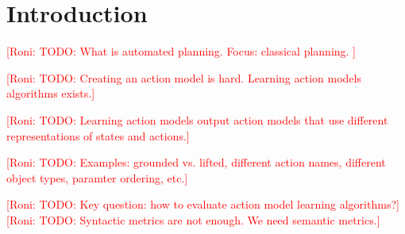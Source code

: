 \documentclass{article}
\theoremstyle{definition}
\theoremstyle{remark}
\newcommand{\roni}[1]{{\textcolor{red}{[Roni: #1]}}}
\begin{document}
\begin{abstract}
\end{abstract}

\section{Introduction}

\roni{TODO: What is automated planning. Focus: classical planning. }


\roni{TODO: Creating an action model is hard. Learning action models algorithms exists.}

\roni{TODO: Learning action models output action models that use different representations of states and actions.}


\roni{TODO: Examples: grounded vs. lifted, different action names, different object types, paramter ordering, etc.}

\roni{TODO: Key question: how to evaluate action model learning algorithms?}
\roni{TODO: Syntactic metrics are not enough. We need semantic metrics.}
\end{document}
